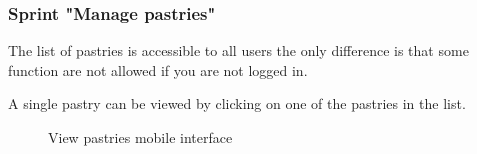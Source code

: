 \documentclass[12pt,a4paper]{report}
\begin{document}
\subsubsection*{Sprint "Manage pastries"}
The list of pastries is accessible to all users the only difference is that some function are not allowed if you are not logged in.\par 
A single pastry can be viewed by clicking on one of the pastries in the list.
\begin{figure}[H]
	\centering
	\vspace*{1in}
	\qquad
	\caption{View pastries mobile interface}%
	\label{managepastries-label}%
\end{figure}
\end{document}
